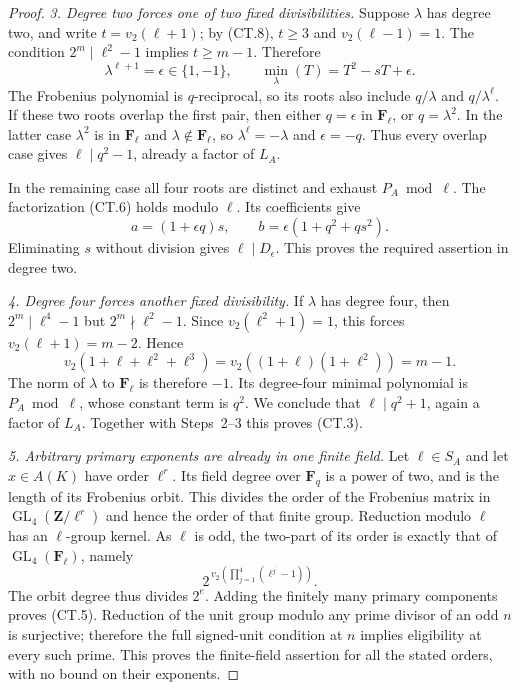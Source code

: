 \begin{proof}
\emph{3. Degree two forces one of two fixed divisibilities.}
Suppose $\lambda$ has degree two, and write
$t=v_2(\ell+1)$; by (CT.8), $t\ge3$ and $v_2(\ell-1)=1$.
The condition $2^m\mid\ell^2-1$ implies $t\ge m-1$.
Therefore
\[
          \lambda^{\ell+1}=\epsilon\in\{1,-1\},
       \qquad
          \operatorname{min}_\lambda(T)=T^2-sT+\epsilon.
 \tag{CT.9}
\]
The Frobenius polynomial is $q$-reciprocal, so its roots also
include $q/\lambda$ and $q/\lambda^\ell$. If these two roots
overlap the first pair, then either $q=\epsilon$ in
$\mathbf F_\ell$, or $q=\lambda^2$.
In the latter case $\lambda^2$ is in $\mathbf F_\ell$ and
$\lambda\notin\mathbf F_\ell$, so
$\lambda^\ell=-\lambda$ and $\epsilon=-q$.
Thus every overlap case gives $\ell\mid q^2-1$, already a factor
of $L_A$.

In the remaining case all four roots are distinct and exhaust
$P_A\bmod\ell$. The factorization (CT.6) holds modulo $\ell$.
Its coefficients give
\[
        a=(1+\epsilon q)s,\qquad
        b=\epsilon(1+q^2+qs^2).
 \tag{CT.10}
\]
Eliminating $s$ without division gives $\ell\mid D_\epsilon$.
This proves the required assertion in degree two.

\emph{4. Degree four forces another fixed divisibility.}
If $\lambda$ has degree four, then
$2^m\mid\ell^4-1$ but $2^m\nmid\ell^2-1$.
Since $v_2(\ell^2+1)=1$, this forces
$v_2(\ell+1)=m-2$. Hence
\[
 v_2(1+\ell+\ell^2+\ell^3)
       =v_2((1+\ell)(1+\ell^2))=m-1.
\]
The norm of $\lambda$ to $\mathbf F_\ell$ is therefore $-1$.
Its degree-four minimal polynomial is $P_A\bmod\ell$, whose
constant term is $q^2$. We conclude that
$\ell\mid q^2+1$, again a factor of $L_A$.
Together with Steps~2--3 this proves (CT.3).

\emph{5. Arbitrary primary exponents are already in one finite field.}
Let $\ell\in S_A$ and let $x\in A(K)$ have order $\ell^r$.
Its field degree over $\mathbf F_q$ is a power of two, and is
the length of its Frobenius orbit. This divides the order of
the Frobenius matrix in
$\operatorname{GL}_4(\mathbf Z/\ell^r)$ and hence the order of
that finite group. Reduction modulo $\ell$ has an $\ell$-group
kernel. As $\ell$ is odd, the two-part of its order is exactly
that of $\operatorname{GL}_4(\mathbf F_\ell)$, namely
\[
        2^{\,v_2(\prod_{j=1}^4(\ell^j-1))}.
 \tag{CT.11}
\]
The orbit degree thus divides $2^e$. Adding the finitely many
primary components proves (CT.5). Reduction of the unit group
modulo any prime divisor of an odd $n$ is surjective; therefore
the full signed-unit condition at $n$ implies eligibility at
every such prime. This proves the finite-field assertion for
all the stated orders, with no bound on their exponents.


\end{proof}
